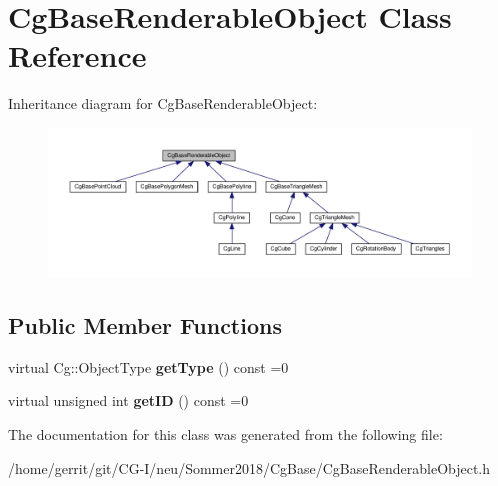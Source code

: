 \hypertarget{class_cg_base_renderable_object}{}\section{Cg\+Base\+Renderable\+Object Class Reference}
\label{class_cg_base_renderable_object}


Inheritance diagram for Cg\+Base\+Renderable\+Object\+:
\nopagebreak
\begin{figure}[H]
\begin{center}
\leavevmode
\includegraphics[width=350pt]{class_cg_base_renderable_object__inherit__graph}
\end{center}
\end{figure}
\subsection*{Public Member Functions}
\begin{DoxyCompactItemize}
\item 
\mbox{\label{class_cg_base_renderable_object_a2b30cd2394bb141e749a35b5c1f9fd86}} 
virtual Cg\+::\+Object\+Type {\bfseries get\+Type} () const =0
\item 
\mbox{\label{class_cg_base_renderable_object_ad107ca8d836a2a23810312b91322e971}} 
virtual unsigned int {\bfseries get\+ID} () const =0
\end{DoxyCompactItemize}


The documentation for this class was generated from the following file\+:\begin{DoxyCompactItemize}
\item 
/home/gerrit/git/\+C\+G-\/\+I/neu/\+Sommer2018/\+Cg\+Base/Cg\+Base\+Renderable\+Object.\+h\end{DoxyCompactItemize}
